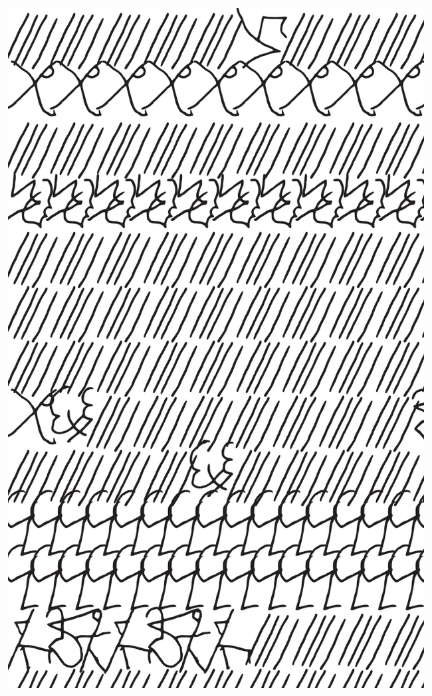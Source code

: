 \makeatletter\@openrightfalse
\movetooddpage
\begin{absolutelynopagebreak}
\begin{vplace}
\begin{figure}[H]
\begin{adjustwidth}{-0.99cm}{}
  \centering
  \vspace*{-1.77cm}
  \hspace*{-0.45cm}
  \includegraphics[width=110mm]{./imgs/img7.pdf}  
  \hfill
\end{adjustwidth}

\thispagestyle{empty}

\end{figure}
\end{vplace}

\end{absolutelynopagebreak}

